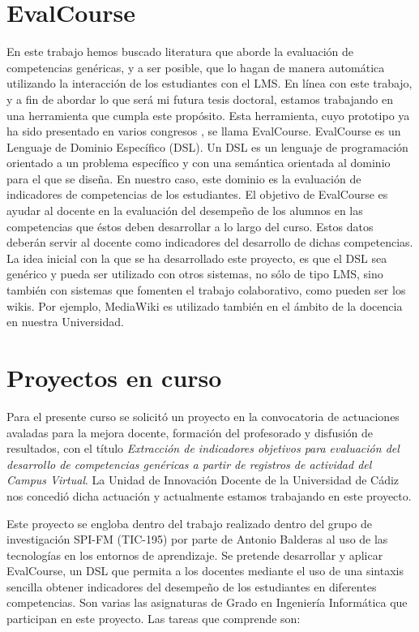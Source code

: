 \section{EvalCourse}
En este trabajo hemos buscado literatura que aborde la evaluación de competencias genéricas, y a ser posible, que lo hagan de manera automática utilizando la interacción de los estudiantes con el LMS. En línea con este trabajo, y a fin de abordar lo que será mi futura tesis doctoral, estamos trabajando en una herramienta que cumpla este propósito. Esta herramienta, cuyo prototipo ya ha sido presentado en varios congresos \cite{Balderas:2013,Balderas:2013a}, se llama EvalCourse. EvalCourse es un Lenguaje de Dominio Específico (DSL). Un DSL es un lenguaje de programación orientado a un problema específico y con una semántica orientada al dominio para el que se diseña. En nuestro caso, este dominio es la evaluación de indicadores de competencias de los estudiantes. El objetivo de EvalCourse es ayudar al docente en la evaluación del desempeño de los alumnos en las competencias que éstos deben desarrollar a lo largo del curso. Estos datos deberán servir al docente como indicadores del desarrollo de dichas competencias. La idea inicial con la que se ha desarrollado este proyecto, es que el DSL sea genérico y pueda ser utilizado con otros sistemas, no sólo de tipo LMS, sino también con sistemas que fomenten el trabajo colaborativo, como pueden ser los wikis. Por ejemplo, MediaWiki es utilizado también en el ámbito de la docencia en nuestra Universidad.

\section{Proyectos en curso}
Para el presente curso se solicitó un proyecto en la convocatoria de actuaciones avaladas para la mejora docente, formación del profesorado y disfusión de resultados, con el título \emph{Extracción de indicadores objetivos para evaluación del desarrollo de competencias genéricas a partir de registros de actividad del Campus Virtual}. La Unidad de Innovación Docente de la Universidad de Cádiz nos concedió dicha actuación y actualmente estamos trabajando en este proyecto.

Este proyecto se engloba dentro del trabajo realizado dentro del grupo de investigación SPI-FM (TIC-195) por parte de Antonio Balderas al uso de las tecnologías en los entornos de aprendizaje. Se pretende desarrollar y aplicar EvalCourse, un DSL que permita a los docentes mediante el uso de una sintaxis sencilla obtener indicadores del desempeño de los estudiantes en diferentes competencias. Son varias las asignaturas de Grado en Ingeniería Informática que participan en este proyecto. Las tareas que comprende son:

